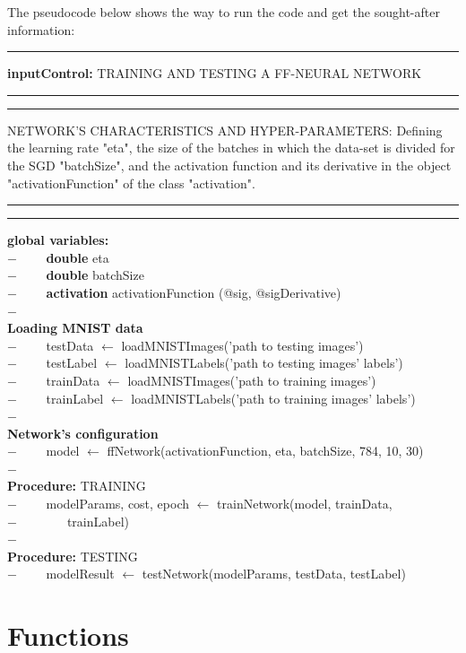 The pseudocode below shows the way to run the code and get the sought-after information:\\
\rule{\textwidth}{0.4pt}
\textbf{inputControl:} TRAINING AND TESTING A FF-NEURAL NETWORK\\
\rule{\textwidth}{0.4pt}
\rule{\textwidth}{0.4pt}
NETWORK'S CHARACTERISTICS AND HYPER-PARAMETERS: Defining the learning rate "eta", the size of the batches in which the data-set is divided for the SGD "batchSize", and the activation function and its derivative in the object "activationFunction" of the class "activation".\\
\rule{\textwidth}{0.4pt}
\rule{\textwidth}{0.4pt}
\begin{addmargin}[2em]{0em}
\textbf{global variables:} \\
$- \qquad$ \textbf{double} eta\\
$- \qquad$ \textbf{double} batchSize\\
$- \qquad$ \textbf{activation} activationFunction (@sig, @sigDerivative)\\
$-$\\
\textbf{Loading MNIST data}\\
$- \qquad$ testData $\leftarrow$ loadMNISTImages('path to testing images')\\
$- \qquad$ testLabel $\leftarrow$ loadMNISTLabels('path to testing images' labels')\\
$- \qquad$ trainData $\leftarrow$ loadMNISTImages('path to training images')\\
$- \qquad$ trainLabel $\leftarrow$ loadMNISTLabels('path to training images' labels')\\
$-$\\
\textbf{Network's configuration}\\
$- \qquad$ model $\leftarrow$ ffNetwork(activationFunction, eta, batchSize, 784, 10, 30)\\
$-$\\
\textbf{Procedure:} TRAINING\\
$- \qquad$ modelParams, cost, epoch $\leftarrow$ trainNetwork(model, trainData, \\
$- \qquad \qquad  $trainLabel)\\
$-$\\
\textbf{Procedure:} TESTING\\
$- \qquad$ modelResult $\leftarrow$ testNetwork(modelParams, testData, testLabel)\\
\end{addmargin}

\section{Functions}\label{Functions}

